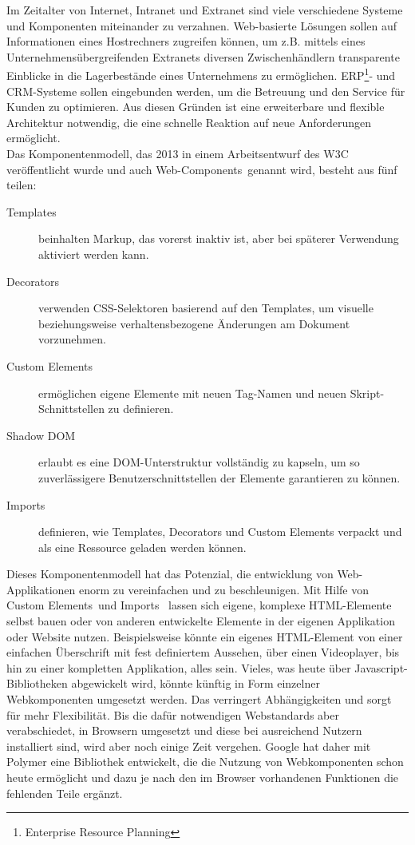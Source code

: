 Im Zeitalter von Internet, Intranet und Extranet sind viele verschiedene Systeme und Komponenten miteinander zu verzahnen. Web-basierte Lösungen sollen auf Informationen eines Hostrechners zugreifen können, um z.B. mittels eines Unternehmensübergreifenden Extranets diversen Zwischenhändlern transparente Einblicke in die Lagerbestände eines Unternehmens zu ermöglichen. ERP\footnote{Enterprise Resource Planning}- und CRM-Systeme sollen eingebunden werden, um die Betreuung und den Service für Kunden zu optimieren. Aus diesen Gründen ist eine erweiterbare und flexible Architektur notwendig, die eine schnelle Reaktion auf neue Anforderungen ermöglicht.\\
Das Komponentenmodell, das 2013 in einem Arbeitsentwurf des W3C veröffentlicht wurde und auch \glqq Web-Components\grqq\ genannt wird, besteht aus fünf teilen:
\begin{description}
\item[Templates] beinhalten Markup, das vorerst inaktiv ist, aber bei späterer Verwendung aktiviert werden kann.
\item[Decorators] verwenden CSS-Selektoren basierend auf den Templates, um visuelle beziehungsweise verhaltensbezogene Änderungen am Dokument vorzunehmen.
\item[Custom Elements] ermöglichen eigene Elemente mit neuen Tag-Namen und neuen Skript-Schnittstellen zu definieren.
\item[Shadow DOM] erlaubt es eine DOM-Unterstruktur vollständig zu kapseln, um so zuverlässigere Benutzerschnittstellen der Elemente garantieren zu können.
\item[Imports] definieren, wie Templates, Decorators und Custom Elements verpackt und als eine Ressource geladen werden können.
\end{description}
Dieses Komponentenmodell hat das Potenzial, die entwicklung von Web-Applikationen enorm zu vereinfachen und zu beschleunigen. Mit Hilfe von \glqq Custom Elements\grqq\ und \glqq Imports \grqq\ lassen sich eigene, komplexe HTML-Elemente selbst bauen oder von anderen entwickelte Elemente in der eigenen Applikation oder Website nutzen. Beispielsweise könnte ein eigenes HTML-Element von einer einfachen Überschrift mit fest definiertem Aussehen, über einen Videoplayer, bis hin zu einer kompletten Applikation, alles sein. Vieles, was heute über Javascript-Bibliotheken abgewickelt wird, könnte künftig in Form einzelner Webkomponenten umgesetzt werden. Das verringert Abhängigkeiten und sorgt für mehr Flexibilität. Bis die dafür notwendigen Webstandards aber verabschiedet, in Browsern umgesetzt und diese bei ausreichend Nutzern installiert sind, wird aber noch einige Zeit vergehen. Google hat daher mit Polymer eine Bibliothek entwickelt, die die Nutzung von Webkomponenten schon heute ermöglicht und dazu je nach den im Browser vorhandenen Funktionen die fehlenden Teile ergänzt.\\
